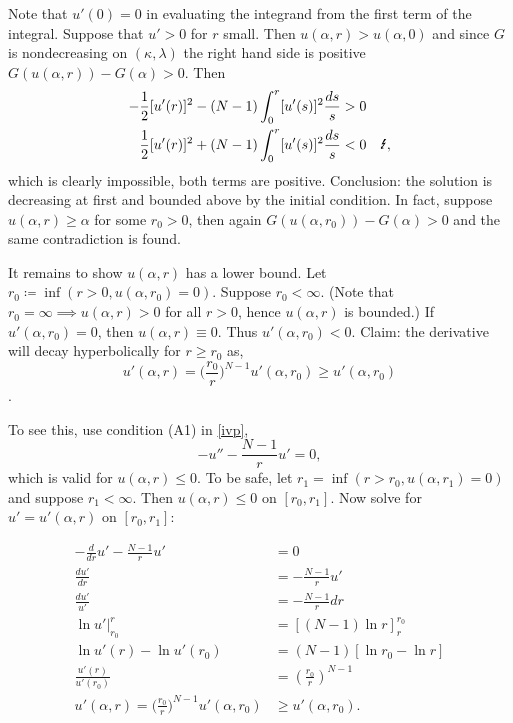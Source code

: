 Note that $u'(0)=0$ in evaluating the integrand from the first term of the integral. Suppose that $u'>0$ for $r$ small. Then $u(\alpha,r)>u(\alpha,0)$ and since $G$ is nondecreasing on $(\kappa,\lambda)$ the right hand side is positive $G(u(\alpha,r))-G(\alpha)>0$. Then
\begin{align*}
-\frac{1}{2}[u'(r)]^2-(N-1)\int_0^r[u'(s)]^2\frac{ds}{s}&>0\\
\frac{1}{2}[u'(r)]^2+(N-1)\int_0^r[u'(s)]^2\frac{ds}{s}&<0\quad\text{\Lightning},
\end{align*}
which is clearly impossible, both terms are positive. Conclusion: the solution is decreasing at first and bounded above by the initial condition. In fact, suppose $u(\alpha,r)\geq\alpha$ for some $r_0>0$, then again $G(u(\alpha,r_0))-G(\alpha)>0$ and the same contradiction is found. 

It remains to show $u(\alpha,r)$ has a lower bound. Let $r_0\coloneqq\inf(r>0,u(\alpha,r_0)=0).$ Suppose $r_0<\infty$. (Note that $r_0=\infty\implies u(\alpha,r)>0$ for all $r>0$, hence $u(\alpha,r)$ is bounded.) If $u'(\alpha,r_0)=0$, then $u(\alpha,r)\equiv0$. Thus $u'(\alpha,r_0)<0$. Claim: the derivative will decay hyperbolically for $r\geq r_0$ as,  $$u'(\alpha,r)=\big(\frac{r_0}{r}\big)^{N-1}u'(\alpha,r_0)\geq u'(\alpha,r_0)$$.

To see this, use condition (A1) in \eqref{ivp},
$$-u''-\frac{N-1}{r}u'=0,$$%
which is valid for $u(\alpha,r)\leq0.$ To be safe, let $r_1=\inf(r>r_0,u(\alpha,r_1)=0)$ and suppose $r_1<\infty$. Then $u(\alpha,r)\leq0$ on $[r_0,r_1]$. Now solve for $u'=u'(\alpha,r)$ on $[r_0,r_1]$:

\begin{align*}
-\frac{d}{dr}u'-\frac{N-1}{r}u'&=0\\
\frac{du'}{dr}&=-\frac{N-1}{r}u'\\
\frac{du'}{u'}&=-\frac{N-1}{r}dr\\
\left.\ln{u'}\right\rvert_{r_0}^r&=\left[(N-1)\ln{r}\right]_r^{r_0}\\
\ln{u'(r)}-\ln{u'(r_0)}&=(N-1)\left[\ln{r_0}-\ln{r}\right]\\
\frac{u'(r)}{u'(r_0)}&=\left(\frac{r_0}{r}\right)^{N-1}\\
u'(\alpha,r)=\big(\frac{r_0}{r}\big)^{N-1}u'(\alpha,r_0)&\geq u'(\alpha,r_0).%
\end{align*}

